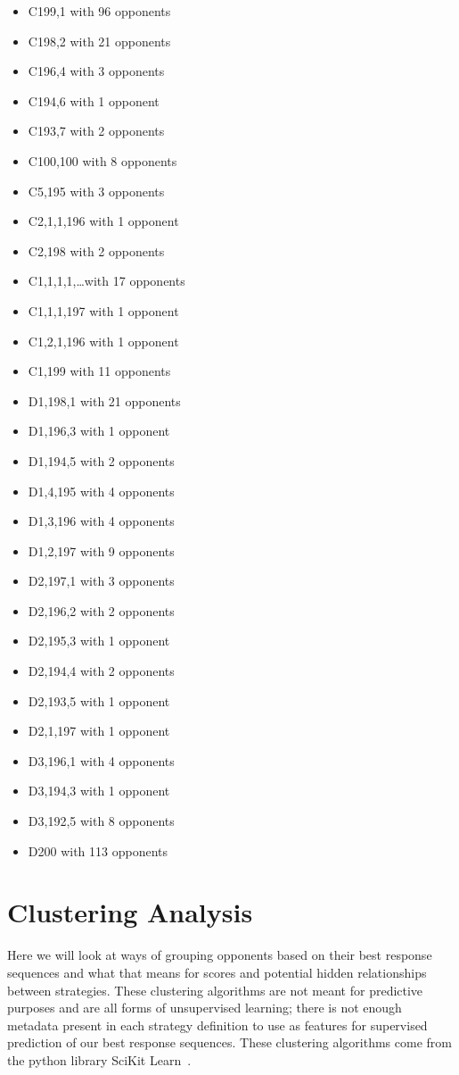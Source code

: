 \begin{multicols}{3}
    \begin{itemize}
        \item  C199,1 with 96 opponents
	    \item  C198,2 with 21 opponents
	    \item  C196,4 with 3 opponents
	    \item  C194,6 with 1 opponent
	    \item  C193,7 with 2 opponents
	    \item  C100,100 with 8 opponents
	    \item  C5,195 with 3 opponents
	    \item  C2,1,1,196 with 1 opponent
	    \item  C2,198 with 2 opponents
	    \item  C1,1,1,1,\ldots with 17 opponents
	    \item  C1,1,1,197 with 1 opponent
	    \item  C1,2,1,196 with 1 opponent
	    \item  C1,199 with 11 opponents
	    \item  D1,198,1 with 21 opponents
	    \item  D1,196,3 with 1 opponent
	    \item  D1,194,5 with 2 opponents
	    \item  D1,4,195 with 4 opponents
	    \item  D1,3,196 with 4 opponents
	    \item  D1,2,197 with 9 opponents
	    \item  D2,197,1 with 3 opponents
	    \item  D2,196,2 with 2 opponents
	    \item  D2,195,3 with 1 opponent
	    \item  D2,194,4 with 2 opponents
	    \item  D2,193,5 with 1 opponent
	    \item  D2,1,197 with 1 opponent
	    \item  D3,196,1 with 4 opponents
	    \item  D3,194,3 with 1 opponent
	    \item  D3,192,5 with 8 opponents
	    \item  D200 with 113 opponents
    \end{itemize}
\end{multicols}


\section{Clustering Analysis}
Here we will look at ways of grouping opponents based on their best response sequences and what that means for scores and potential hidden relationships between strategies.
These clustering algorithms are not meant for predictive purposes and are all forms of unsupervised learning; there is not enough metadata present in each strategy definition to use as features for supervised prediction of our best response sequences.
These clustering algorithms come from the python library SciKit Learn~\cite{pedregosa2011scikit}.

